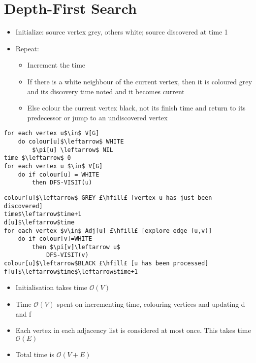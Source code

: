 \documentclass{article}[18pt]
\begin{document}
\section{Depth-First Search}
\begin{itemize}
	\item Initialize: source vertex grey, others white; source discovered at time 1
	\item Repeat:
	\begin{itemize}
		\item Increment the time
		\item If there is a white neighbour of the current vertex, then it is coloured grey and its discovery time noted and it becomes current
		\item Else colour the current vertex black, not its finish time and return to its predecessor or jump to an undiscovered vertex
	\end{itemize}
\end{itemize}
\begin{lstlisting}[caption=DFS(G)]
for each vertex u$\in$ V[G]
	do colour[u]$\leftarrow$ WHITE
		$\pi[u] \leftarrow$ NIL
time $\leftarrow$ 0
for each vertex u $\in$ V[G]
	do if colour[u] = WHITE
		then DFS-VISIT(u)
\end{lstlisting}
\begin{lstlisting}[caption=DFS-VISIT(u)]
colour[u]$\leftarrow$ GREY £\hfill£ [vertex u has just been discovered]
time$\leftarrow$time+1
d[u]$\leftarrow$time
for each vertex $v\in$ Adj[u] £\hfill£ [explore edge (u,v)]
	do if colour[v]=WHITE
		then $\pi[v]\leftarrow u$
			DFS-VISIT(v)
colour[u]$\leftarrow$BLACK £\hfill£ [u has been processed]
f[u]$\leftarrow$time$\leftarrow$time+1
\end{lstlisting}
\begin{itemize}
	\item Initialisation takes time $\mathcal{O}(V)$
	\item Time $\mathcal{O}(V)$ spent on incrementing time, colouring vertices and updating d and f
	\item Each vertex in each adjacency list is considered at most once. This takes time $\mathcal{O}(E)$
	\item Total time is $\mathcal{O}(V+E)$
\end{itemize}
\end{document}
